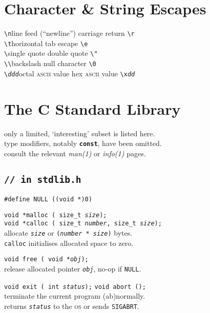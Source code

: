 \documentclass[8pt]{article}
\newcommand{\Cc}[1]{\texttt{#1}}
\newcommand{\cmt}[1]{\textcolor[gray]{.3}{\texttt{#1}}} %
\newcommand{\cpp}[1]{\textcolor{black!20!cyan}{\texttt{\##1}}} %
\newcommand{\ty}[1]{\textcolor{blue!80}{\texttt{#1}}} %
\newcommand{\mty}[1]{\textcolor{blue!80}{\texttt{\textbf{#1}}}} %
\newcommand{\kv}[1]{\textcolor{red!40!black}{\texttt{#1}}} %
\newcommand{\val}[1]{\texttt{#1}} %
\newcommand{\fn}[1]{\texttt{#1}} %
\newcommand{\var}[1]{\texttt{\textit{#1}}} %
\newcommand{\opt}[1]{\textrm{\textit{#1}}} %
\newcommand{\htab}{\hspace*{2em}} %
\newcommand{\Cq}{\textquotesingle} %
\newcommand{\Cx}{\textbackslash} %
\begin{document}
\begin{multicols}{3}
\section*{Character \& String Escapes}

\Cc{\Cx n}\quad line feed (``newline'') \hfill
carriage return \quad\Cc{\Cx r}\\
\Cc{\Cx t}\quad horizontal tab \hfill
escape \quad\Cc{\Cx e}\\
\Cc{\Cx \Cq}\quad single quote \hfill
double quote \quad\Cc{\Cx " }\\
\Cc{\Cx \Cx}\quad backslash \hfill
null character \quad\Cc{\Cx 0}\\
\Cc{\Cx \opt{ddd}}\quad octal \textsc{ascii} value \hfill
hex \textsc{ascii} value \quad\Cc{\Cx x\opt{dd}} \\


\section*{The C Standard Library}

\begin{center}
only a limited, `interesting' subset is listed here. \\
type modifiers, notably \mty{const}, have been omitted. \\
consult the relevant \textit{man(1)} or \textit{info(1)} pages.
\end{center}

\subsection*{\Cc{\cmt{// in stdlib.h}}}

\Cc{\cpp{define} \kv{NULL} ((\ty{void *})\val{0})}

\Cc{\ty{void *}\fn{malloc}\,(%
    \ty{size\_t} \var{size});} \\
\Cc{\ty{void *}\fn{calloc}\,(%
    \ty{size\_t} \var{number}, %
    \ty{size\_t} \var{size});} \\
\htab allocate \var{size} or \Cc{(\var{number} * \var{size})} bytes. \\
\htab \fn{calloc} initialises allocated space to zero.

\Cc{\ty{void} \fn{free}\,(%
    \ty{void *}\var{obj});} \\
\htab release allocated pointer \var{obj}, no-op if \kv{NULL}.

\Cc{\ty{void} \fn{exit}\,(%
    \ty{int} \var{status});} \hfill
\Cc{\ty{void} \fn{abort}\,();} \\
\htab terminate the current program (ab)normally. \\
\htab returns \var{status} to the \textsc{os} or sends \kv{SIGABRT}.


\end{multicols}
\end{document}
